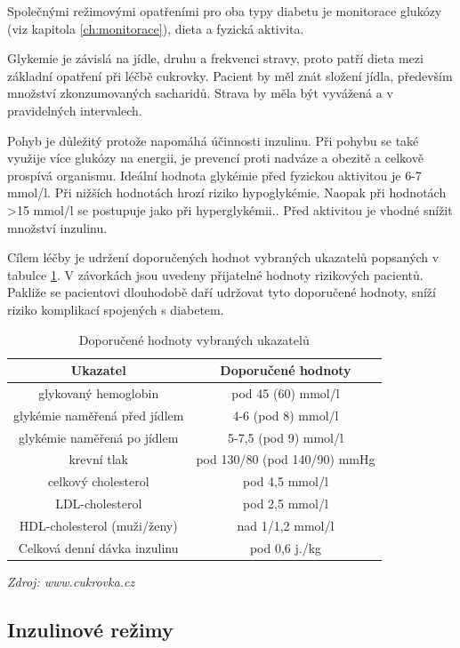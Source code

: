 Společnými režimovými opatřeními pro oba typy diabetu je monitorace glukózy (viz kapitola \ref{ch:monitorace}), dieta a fyzická aktivita.

Glykemie je závislá na jídle, druhu a frekvenci stravy, proto patří dieta mezi základní opatření při léčbě cukrovky. Pacient by měl znát složení jídla, především množství zkonzumovaných sacharidů. Strava by měla být vyvážená a v pravidelných intervalech.

Pohyb je důležitý protože napomáhá účinnosti inzulinu. Při pohybu se také využije více glukózy na energii, je prevencí proti nadváze a obezitě a celkově prospívá organismu. Ideální hodnota glykémie před fyzickou aktivitou je 6-7 mmol/l. Při nižších hodnotách hrozí riziko hypoglykémie. Naopak při hodnotách >15 mmol/l se postupuje jako při hyperglykémii.. Před aktivitou je vhodné snížit množství inzulinu.

Cílem léčby je udržení doporučených hodnot vybraných ukazatelů popsaných v tabulce \ref{tab:ukazatele}. V závorkách jsou uvedeny přijatelné hodnoty rizikových pacientů. Pakliže se pacientovi dlouhodobě daří udržovat tyto doporučené hodnoty, sníží riziko komplikací spojených s diabetem.
\cite{Diabetes.Psottova,cukrovka.cz}

\begin{table}[ht]
\caption{Doporučené hodnoty vybraných ukazatelů}
\label{tab:ukazatele}
\begin{tabular}{|c|c|}
\hline 
\textbf{Ukazatel} & \textbf{Doporu\v{c}ené hodnoty}\tabularnewline
\hline 
\hline 
glykovaný hemoglobin & pod 45 (60) mmol/l\\ \hline 
glykémie naměřená před jídlem & 4-6 (pod 8) mmol/l\\ \hline 
glykémie naměřená po jídlem & 5-7,5 (pod 9) mmol/l\\ \hline 
krevní tlak & pod 130/80 (pod 140/90) mmHg\\ \hline 
celkový cholesterol & pod 4,5 mmol/l\\ \hline 
LDL-cholesterol & pod 2,5 mmol/l\\ \hline 
HDL-cholesterol (muži/ženy) & nad 1/1,2 mmol/l\\ \hline 
Celková denní dávka inzulinu & pod 0,6 j./kg\\
\hline 
\end{tabular}
\end{table}
\textit{Zdroj: www.cukrovka.cz}


\subsection{Inzulinové režimy}
\label{ch:inzulin}

